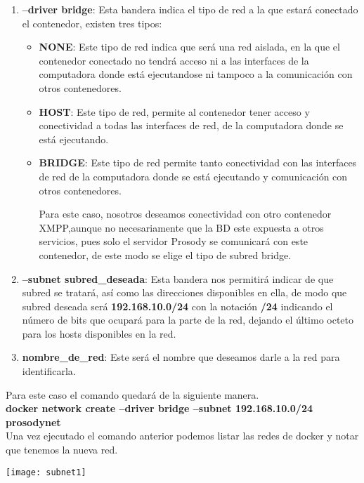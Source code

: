 \documentclass[10pt,letterpaper]{article}
\begin{document}
\begin{enumerate}
\item \textbf{--driver bridge}: Esta bandera indica el tipo de red a la que estará conectado el contenedor, existen tres tipos:
	\begin{itemize}
		\item \textbf{NONE}: Este tipo de red indica que será una red aislada, en la que el contenedor conectado no tendrá acceso ni a las interfaces de la computadora donde está ejecutandose ni tampoco a la comunicación con otros contenedores.
		
		\item \textbf{HOST}: Este tipo de red, permite al contenedor tener acceso y conectividad a todas las interfaces de red, de la computadora donde se está ejecutando.
		
		\item \textbf{BRIDGE}: Este tipo de red permite tanto conectividad con las interfaces de red de la computadora donde se está ejecutando y comunicación con otros contenedores.
		
Para este caso, nosotros deseamos conectividad con otro contenedor XMPP,aunque no necesariamente que la BD este expuesta a otros servicios, pues solo el servidor Prosody se comunicará con este contenedor, de este modo se elige el tipo de subred bridge.
	\end{itemize}

\item \textbf{--subnet subred\_deseada}: Esta bandera nos permitirá indicar de que subred se tratará, así como las direcciones disponibles en ella, de modo que subred deseada será \textbf{192.168.10.0/24} con la notación \textbf{/24} indicando el número de bits que ocupará para la parte de la red, dejando el último octeto para los hosts disponibles en la red.

\item \textbf{nombre\_de\_red}: Este será el nombre que deseamos darle a la red para identificarla.
\end{enumerate}

Para este caso el comando quedará de la siguiente manera.\\

\textbf{docker network create --driver bridge --subnet 192.168.10.0/24 prosodynet}\\

Una vez ejecutado el comando anterior podemos listar las redes de docker y notar que tenemos la nueva red.

\begin{center}
\texttt{[image: subnet1]}
\end{center}
\end{document}
